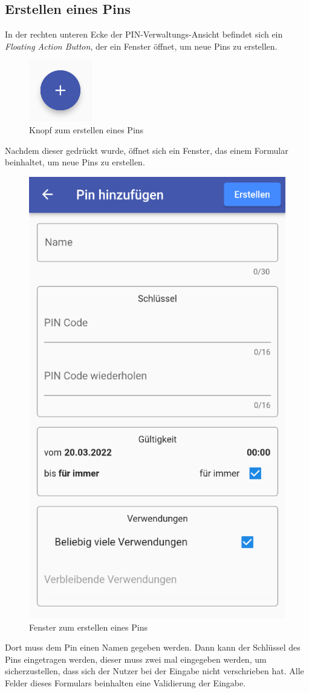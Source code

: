 \subsection{Erstellen eines Pins}
In der rechten unteren Ecke der PIN-Verwaltungs-Ansicht befindet sich ein \textit{Floating Action Button},
der ein Fenster öffnet, um neue Pins zu erstellen.

\begin{figure}[H]
    \begin{center}
        \includegraphics[width=.1\textwidth]{images/mobile/CreatePinButton.png}
        \caption{Knopf zum erstellen eines Pins}
    \end{center}
\end{figure}

Nachdem dieser gedrückt wurde, öffnet sich ein Fenster, das einem Formular beinhaltet, um neue Pins zu erstellen.

\begin{figure}[H]
    \begin{center}
        \includegraphics[width=.5\textwidth]{images/mobile/CreatePin.png}
        \caption{Fenster zum erstellen eines Pins}
    \end{center}
\end{figure}

Dort muss dem Pin einen Namen gegeben werden.
Dann kann der Schlüssel des Pins eingetragen werden, dieser muss zwei mal eingegeben werden, um sicherzustellen,
dass sich der Nutzer bei der Eingabe nicht verschrieben hat.
Alle Felder dieses Formulars beinhalten eine Validierung der Eingabe.

